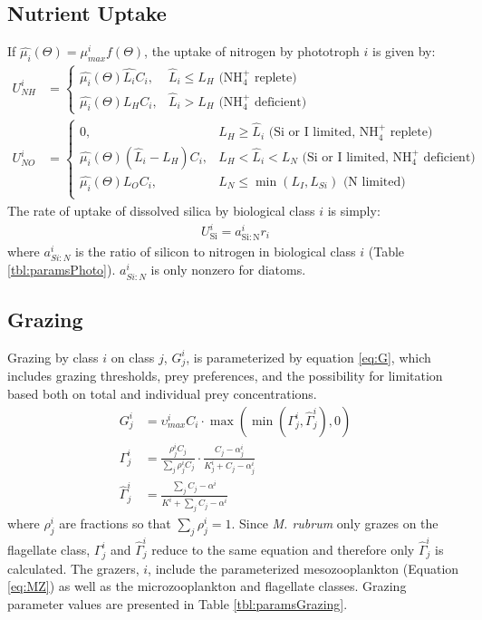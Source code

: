 \documentclass[draft,jgrga]{agutexSI2019}
\begin{document}
\begin{article}
\subsection*{Nutrient Uptake}
If $\hat{\mu_i}(\Theta)=\mu_{max}^if(\Theta)$, the uptake of nitrogen by phototroph $i$ is given by:
\begin{align}
U_{NH}^i & =
  \begin{cases}
     \hat{\mu_i}(\Theta) \hat{L_i}C_i, & \hat{L}_i\leq L_H \text{ (NH$_{4}^{+}$ replete)}\\
     \hat{\mu_i}(\Theta) L_HC_i, & \hat{L}_i> L_H \text{ (NH$_{4}^{+}$ deficient)}
  \end{cases}  \label{eq:U_NH} \\
U_{NO}^i & =  %
  \begin{cases}
     0, & L_H\geq \hat{L}_i \text{ (Si or I limited, NH$_{4}^{+}$ replete)}\\
     \hat{\mu_i}(\Theta) (\hat{L}_i-L_H)C_i, & L_H<\hat{L}_i<L_N \text{ (Si or I limited, NH$_{4}^{+}$ deficient)}\\
     \hat{\mu_i}(\Theta) L_OC_i, & L_N\leq \min(L_I,L_{Si}) \text{ (N limited)}\\
  \end{cases} \label{eq:U_NO}
\end{align}
The rate of uptake of dissolved silica by biological class $i$ is simply:
\begin{align}
\label{eq:U_Si}
  U_{\mathrm{Si}}^i = a_{\mathrm{Si:N}}^i r_i
\end{align}
where $a_{Si:N}^i$ is the ratio of silicon to nitrogen in biological class $i$ (Table \ref{tbl:paramsPhoto}). $a_{Si:N}^i$ is only nonzero for diatoms. 

\subsection*{Grazing}

Grazing by class $i$ on class $j$, $G_j^i$, is parameterized by equation \ref{eq:G}, which includes grazing thresholds, prey preferences, and the possibility for limitation based both on total and individual prey concentrations. 
\begin{align}
\label{eq:G}
   G_j^i & = \upsilon_{max}^i C_i \cdot  \max\left( \min(\Gamma_j^i,\hat{\Gamma}_j^i),0\right) \\
    \Gamma_j^i & = \frac{\rho_j^iC_j}{\sum_j\rho_j^iC_j} \cdot \frac{C_j-\alpha_j^i}{K_j^i+C_j-\alpha_j^i} \\
    \hat{\Gamma}_j^i & =  \frac{\sum_jC_j-\alpha^i}{K^i+\sum_jC_j-\alpha^i} 
\end{align}
where $\rho_j^i$ are fractions so that $\sum_j \rho_j^i = 1$. 
Since \textit{M. rubrum} only grazes on the flagellate class, $\Gamma_j^i$ and $\hat{\Gamma}_j^i$ reduce to the same equation and therefore only $\hat{\Gamma}_j^i$ is calculated. 
The grazers, $i$, include the parameterized mesozooplankton (Equation \ref{eq:MZ}) as well as the microzooplankton and flagellate classes. 
Grazing parameter values are presented in Table \ref{tbl:paramsGrazing}.
 

\end{article}
\end{document}
